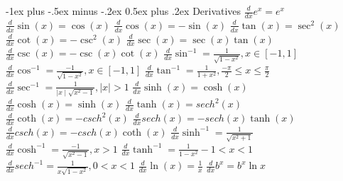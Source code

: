 \documentclass[10pt,a4paper,landscape]{article}
\makeatletter
\renewcommand{\section}{\@startsection{section}{1}{0mm}%
{-1ex plus -.5ex minus -.2ex}%
{0.5ex plus .2ex}%
{\normalfont\large\bfseries}}
\makeatother
\begin{document}
\raggedright
\footnotesize
\begin{multicols*}{5}


	\setlength{\premulticols}{1pt}
	\setlength{\postmulticols}{1pt}
	\setlength{\multicolsep}{1pt}
	\setlength{\columnsep}{2pt}

	\section{Derivatives}
	\scriptsize
	$\frac{d}{dx} e^x=e^x$\newline
	$\frac{d}{dx} \sin(x)=\cos(x)$\newline
	$\frac{d}{dx} \cos(x)=-\sin(x)$\newline
	$\frac{d}{dx} \tan(x)=\sec^2(x)$\newline
	$\frac{d}{dx} \cot(x)=-\csc^2(x)$\newline
	$\frac{d}{dx} \sec(x)=\sec(x)\tan(x)$\newline
	$\frac{d}{dx} \csc(x)=-\csc(x)\cot(x)$\newline
	$\frac{d}{dx} \sin^{-1}=\frac{1}{\sqrt{1-x^2}}, x \in [-1,1]$\newline
	$\frac{d}{dx} \cos^{-1}=\frac{-1}{\sqrt{1-x^2}}, x \in [-1,1]$\newline
	$\frac{d}{dx} \tan^{-1}=\frac{1}{1+x^2}, \frac{-\pi}{2}\le x \le \frac{\pi}{2}$\newline
	$\frac{d}{dx} \sec^{-1}=\frac{1}{\mid x \mid \sqrt{x^2-1}}, |x| > 1$\newline
	$\frac{d}{dx} \sinh(x)=\cosh(x)$\newline
	$\frac{d}{dx} \cosh(x)=\sinh(x)$\newline
	$\frac{d}{dx} \tanh(x)=sech^2(x)$\newline
	$\frac{d}{dx} \coth(x)=-csch^2(x)$\newline
	$\frac{d}{dx} sech(x)=-sech(x)\tanh(x)$\newline
	$\frac{d}{dx} csch(x)=-csch(x)\coth(x)$\newline
	$\frac{d}{dx} \sinh^{-1}=\frac{1}{\sqrt{x^2+1}}$\newline
	$\frac{d}{dx} \cosh^{-1}=\frac{-1}{\sqrt{x^2-1}}, x > 1$\newline
	$\frac{d}{dx} \tanh^{-1}=\frac{1}{1-x^2} -1 < x < 1$\newline
	$\frac{d}{dx} sech^{-1}=\frac{1}{x \sqrt{1-x^2}}, 0 < x < 1$
	$\frac{d}{dx} \ln(x) = \frac{1}{x} $\newline
	$\frac{d}{dx} b^x = b^x \ln{x} $ 


\end{multicols*}
\end{document}
